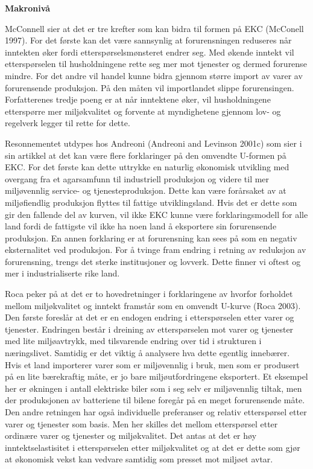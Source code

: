 \documentclass[
  12pt,
  letterpaper,
  DIV=11,
  numbers=noendperiod]{scrartcl}
\begin{document}
\textbf{Makronivå}

McConnell sier at det er tre krefter som kan bidra til formen på EKC
(McConell 1997). For det første kan det være sannsynlig at
forurensningen reduseres når inntekten øker fordi etterspørselsmønsteret
endrer seg. Med økende inntekt vil etterspørselen til husholdningene
rette seg mer mot tjenester og dermed forurense mindre. For det andre
vil handel kunne bidra gjennom større import av varer av forurensende
produksjon. På den måten vil importlandet slippe forurensingen.
Forfatterenes tredje poeng er at når inntektene øker, vil husholdningene
etterspørre mer miljøkvalitet og forvente at myndighetene gjennom lov-
og regelverk legger til rette for dette.

Resonnementet utdypes hos Andreoni (Andreoni and Levinson 2001c) som
sier i sin artikkel at det kan være flere forklaringer på den omvendte
U-formen på EKC. For det første kan dette uttrykke en naturlig økonomisk
utvikling med overgang fra et agarsamfunn til industriell produksjon og
videre til mer miljøvennlig service- og tjenesteproduksjon. Dette kan
være forårsaket av at miljøfiendlig produksjon flyttes til fattige
utviklingsland. Hvis det er dette som gir den fallende del av kurven,
vil ikke EKC kunne være forklaringsmodell for alle land fordi de
fattigste vil ikke ha noen land å eksportere sin forurensende
produksjon. En annen forklaring er at forurensning kan sees på som en
negativ eksternalitet ved produksjon. For å tvinge fram endring i
retning av reduksjon av forurensning, trengs det sterke institusjoner og
lovverk. Dette finner vi oftest og mer i industrialiserte rike land.

Roca peker på at det er to hovedretninger i forklaringene av hvorfor
forholdet mellom miljøkvalitet og inntekt framstår som en omvendt
U-kurve (Roca 2003). Den første foreslår at det er en endogen endring i
etterspørselen etter varer og tjenester. Endringen består i dreining av
etterspørselen mot varer og tjenester med lite miljøavtrykk, med
tilsvarende endring over tid i strukturen i næringslivet. Samtidig er
det viktig å analysere hva dette egentlig innebærer. Hvis et land
importerer varer som er miljøvennlig i bruk, men som er produsert på en
lite bærekraftig måte, er jo bare miljøutfordringene eksportert. Et
eksempel her er økningen i antall elektriske biler som i seg selv er
miljøvennlig tiltak, men der produksjonen av batteriene til bilene
foregår på en meget forurensende måte. Den andre retningen har også
individuelle preferanser og relativ etterspørsel etter varer og
tjenester som basis. Men her skilles det mellom etterspørsel etter
ordinære varer og tjenester og miljøkvalitet. Det antas at det er høy
inntektselastisitet i etterspørselen etter miljøkvalitet og at det er
dette som gjør at økonomisk vekst kan vedvare samtidig som presset mot
miljøet avtar.
\end{document}

